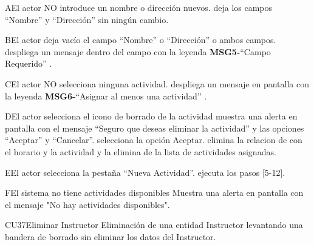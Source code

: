 		\begin{UCtrayectoriaA}{A}{El actor NO introduce un nombre o dirección nuevos.}
			\UCpaso deja los campos “Nombre” y “Dirección” sin ningún cambio.
		\end{UCtrayectoriaA}
		
		\begin{UCtrayectoriaA}{B}{El actor deja vacío el campo “Nombre” o “Dirección” o ambos campos.}
			\UCpaso despliega un mensaje dentro del campo con la leyenda {\bf MSG5-}``Campo Requerido'' .
		\end{UCtrayectoriaA}
		\begin{UCtrayectoriaA}{C}{El actor NO selecciona ninguna actividad.}
			\UCpaso despliega un mensaje en pantalla con la leyenda {\bf MSG6-}``Asignar al menos una actividad'' .
		\end{UCtrayectoriaA}
		\begin{UCtrayectoriaA}{D}{El actor selecciona el icono de borrado de la actividad }
			\UCpaso muestra una alerta en pantalla con el mensaje “Seguro que deseas eliminar la actividad” y las opciones “Aceptar” y “Cancelar”.
		    \UCpaso[\UCactor] selecciona la opción Aceptar.
		    \UCpaso elimina la relacion de con el horario y la actividad y la elimina de la lista de actividades asignadas.
		\end{UCtrayectoriaA}
		\begin{UCtrayectoriaA}{E}{El actor selecciona la pestaña “Nueva Actividad”.}
			\UCpaso ejecuta los pasos [5-12].
		\end{UCtrayectoriaA}
		\begin{UCtrayectoriaA}{F}{El sistema no tiene actividades disponibles}
			\UCpaso Muestra una alerta en pantalla con el mensaje "No hay actividades disponibles".
		\end{UCtrayectoriaA}		
\begin{UseCase}{CU37}{Eliminar Instructor}{
		Eliminación de una entidad Instructor levantando una bandera de borrado sin eliminar los datos del Instructor.
	}
\end{UseCase}
